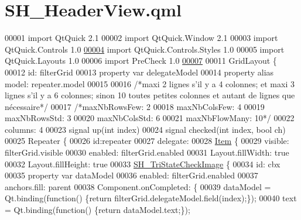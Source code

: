 \hypertarget{SH__HeaderView_8qml}{\section{S\-H\-\_\-\-Header\-View.\-qml}
\label{SH__HeaderView_8qml}
}

\begin{DoxyCode}
00001 \textcolor{keyword}{import} QtQuick 2.1
00002 import QtQuick.Window 2.1
00003 import QtQuick.Controls 1.0
\hypertarget{SH__HeaderView_8qml_source_l00004}{}\hyperlink{classSH__HeaderView}{00004} import QtQuick.Controls.Styles 1.0
00005 import QtQuick.Layouts 1.0
00006 import PreCheck 1.0
\hypertarget{SH__HeaderView_8qml_source_l00007}{}\hyperlink{classSH__HeaderView_a95ec60701e7213acbe17fdc477feb83c}{00007} 
00011 GridLayout \{
00012     \textcolor{keywordtype}{id}: filterGrid
00013     \textcolor{keyword}{property} var delegateModel
00014     \textcolor{keyword}{property} alias model: repeater.model
00015 
00016     \textcolor{comment}{/*maxi 2 lignes s'il y a 4 colonnes; et maxi 3 lignes s'il y a 6 colonnes; sinon 10 toutes petites
       colonnes et autant de lignes que nécessaire*/}
00017     \textcolor{comment}{/*maxNbRowsFew: 2}
00018 \textcolor{comment}{    maxNbColsFew: 4}
00019 \textcolor{comment}{    maxNbRowsStd: 3}
00020 \textcolor{comment}{    maxNbColsStd: 6}
00021 \textcolor{comment}{    maxNbFlowMany: 10*/}
00022     columns: 4
00023     signal up(\textcolor{keywordtype}{int} index)
00024     signal checked(\textcolor{keywordtype}{int} index, \textcolor{keywordtype}{bool} ch)
00025     Repeater \{
00026         \textcolor{keywordtype}{id}:repeater
00027         delegate:
00028             \hyperlink{classItem}{Item} \{
00029             visible: filterGrid.visible
00030             enabled: filterGrid.enabled
00031             Layout.fillWidth: \textcolor{keyword}{true}
00032             Layout.fillHeight: \textcolor{keyword}{true}
00033             \hyperlink{classSH__TriStateCheckImage}{SH\_TriStateCheckImage} \{
00034                 \textcolor{keywordtype}{id}: cbx
00035                 \textcolor{keyword}{property} var dataModel
00036                 enabled: filterGrid.enabled
00037                 anchors.fill: parent
00038                 Component.onCompleted: \{
00039                     dataModel = Qt.binding(\textcolor{keyword}{function}() \{\textcolor{keywordflow}{return} filterGrid.delegateModel.field(index);\});
00040                     text = Qt.binding(\textcolor{keyword}{function}() \{\textcolor{keywordflow}{return} dataModel.text;\});

\end{DoxyCode}
